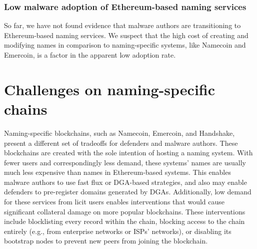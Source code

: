 \documentclass[conference]{IEEEtran}
\begin{document}
\subsubsection{Low malware adoption of Ethereum-based naming services}

So far, we have not found evidence that malware authors are 
transitioning to Ethereum-based naming services. We suspect that the high 
cost of creating and modifying names in comparison to naming-specific systems, 
like Namecoin and Emercoin, is a 
factor in the apparent low adoption rate. 


\section{Challenges on naming-specific chains}

Naming-specific blockchains, such as Namecoin, Emercoin, and Handshake, 
present 
a different set of tradeoffs for defenders and malware authors. These 
blockchains are created with the sole intention of hosting a naming system. 
With fewer users and correspondingly less demand, these systems' names are 
usually much less expensive than names in Ethereum-based systems. This enables 
malware 
authors to use fast flux or DGA-based strategies, and also may enable 
defenders 
to pre-register domains generated by DGAs. Additionally, low demand for 
these 
services from licit users enables interventions that would cause significant 
collateral damage on more popular blockchains. These interventions include 
blocklisting every record within the chain, blocking access to the chain 
entirely (e.g., from enterprise networks or ISPs' networks), or disabling 
its 
bootstrap nodes to prevent new peers from joining the blockchain.
\end{document}
